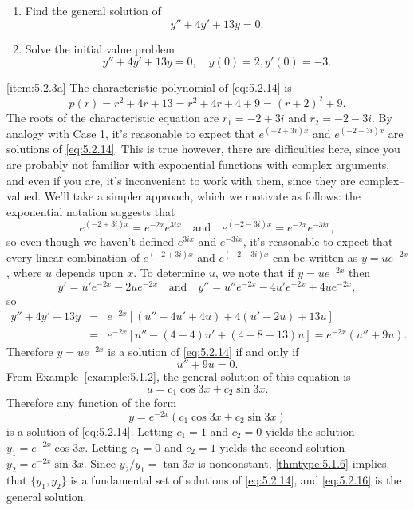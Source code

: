 \documentclass{ximera}
\begin{document}
\begin{example}\label{example:5.2.3}
\begin{enumerate}
\item \label{item:5.2.3a}%
Find the general solution of
\begin{equation} \label{eq:5.2.14}
y''+4y'+13y=0.
\end{equation}
 
\item \label{item:5.2.3b}%
Solve the initial value problem
\begin{equation} \label{eq:5.2.15}
y''+4y'+13y=0, \quad   y(0)=2,  y'(0)=-3.
\end{equation}
\end{enumerate}
 
\begin{explanation}
\ref{item:5.2.3a} The characteristic
polynomial of
 \eqref{eq:5.2.14} is
$$
p(r)=r^2+4r+13=r^2+4r+4+9=(r+2)^2+9.
$$
The roots of the characteristic equation are $r_1=-2+3i$ and
$r_2=-2-3i$. By analogy with Case 1, it's reasonable to expect that
$e^{(-2+3i)x}$ and $e^{(-2-3i)x}$ are solutions of \eqref{eq:5.2.14}. This
is true %
however, there are
difficulties here, since you are probably not familiar with
exponential functions with complex arguments, and even if you are, it's
 inconvenient to work with them, since they are complex--valued. We'll
 take a simpler approach, which we motivate as follows: the
exponential notation suggests that
$$
e^{(-2+3i)x}=e^{-2x}e^{3ix}\quad\mbox{and}\quad
e^{(-2-3i)x}=e^{-2x}e^{-3ix},
$$
so even though we haven't defined $e^{3ix}$ and $e^{-3ix}$, it's
reasonable to expect that every linear
combination of $e^{(-2+3i)x}$ and $e^{(-2-3i)x}$ can be written as
$y=ue^{-2x}$, where $u$ depends upon $x$. To determine $u$, we note
that if $y=ue^{-2x}$ then
$$
y'=u'e^{-2x}-2ue^{-2x}\quad\mbox{and}\quad
y''=u''e^{-2x}-4u'e^{-2x}+4ue^{-2x},
$$
so
\begin{eqnarray*}
y''+4y'+13y&=&e^{-2x}\left[(u''-4u'+4u)+4(u'-2u)+13u\right]\\
&=&e^{-2x}\left[u''-(4-4)u'+(4-8+13)u\right]=e^{-2x}(u''+9u).
\end{eqnarray*}
Therefore $y=ue^{-2x}$ is a solution of \eqref{eq:5.2.14} if and only if
$$
u''+9u=0.
$$
From Example~\ref{example:5.1.2}, the  general solution of this equation is
$$
u=c_1\cos 3x +c_2\sin 3x.
$$
 Therefore any function of the form
\begin{equation} \label{eq:5.2.16}
y=e^{-2x}(c_1\cos 3x+c_2\sin 3x)
\end{equation}
is  a solution of \eqref{eq:5.2.14}.
Letting $c_1=1$ and $c_2=0$  yields the solution
 $y_1=e^{-2x}\cos3x$. Letting $c_1=0$ and $c_2=1$
yields the second solution $y_2=e^{-2x}\sin3x$. Since
$y_2/y_1=\tan3x$
is nonconstant, \ref{thmtype:5.1.6} implies that   $\{y_1,y_2\}$ is
a fundamental set of solutions of \eqref{eq:5.2.14}, and \eqref{eq:5.2.16}
is the general solution.
 

\end{explanation}
\end{example}
\end{document}
